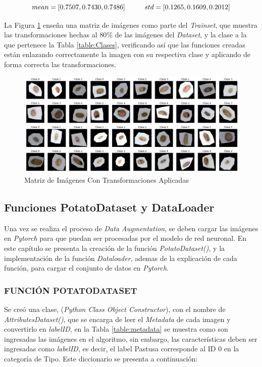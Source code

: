 \begin{equation}
	{mean = [0.7507, 0.7430, 0.7486] \hspace*{1cm}  std  = [0.1265, 0.1609, 0.2012]}
	\label{eq:meanstd2}
\end{equation}

La Figura \ref{fig:agumentation} enseña una matriz de imágenes como parte del \textit{Trainset}, que muestra las transformaciones hechas al $80\%$ de las imágenes del \textit{Dataset}, y la clase a la que pertenece la Tabla \ref{table:Clases}, verificando así que las funciones creadas están enlazando correctamente la imagen con su respectiva clase y aplicando de forma correcta las transformaciones.


\begin{figure}[ht]
	\centering
	\includegraphics[scale=0.4]{Figs/augmentation.png}
	\caption{Matriz de Imágenes Con Transformaciones Aplicadas}
	\label{fig:agumentation}
\end{figure}	

\subsection{Funciones PotatoDataset y DataLoader}

Una vez se realiza el proceso de \textit{Data Augmentation}, se deben cargar las imágenes en \textit{Pytorch} para que puedan ser procesadas por el modelo de red neuronal. En este capítulo se presenta la creación de la función \textit{PotatoDataset()}, y la implementación de la función \textit{Dataloader}, ademas de la explicación de cada función, para cargar el conjunto de datos en \textit{Pytorch}.


\subsubsection{FUNCIÓN POTATODATASET}

Se creó una clase, (\textit{Python Class Object Constructor}), con el nombre de \textit{AttributesDataset()}, que se encarga de leer el \textit{Metadata} de cada imagen y convertirlo en \textit{labelID}, en la Tabla \ref{table:metadata} se muestra como son ingresadas las imágenes en el algoritmo, sin embargo, las características deben ser ingresadas como \textit{labelID}, es decir, el label Pastusa corresponde al ID 0 en la categoría de Tipo. Este diccionario se presenta a continuación:			

